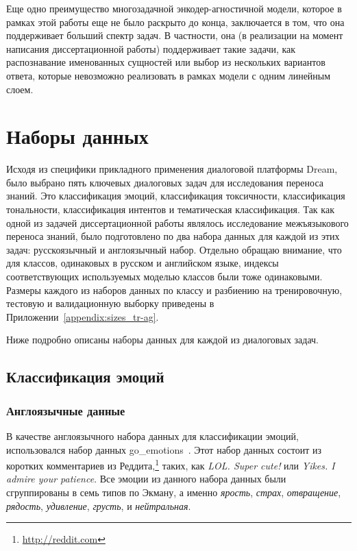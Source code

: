 Еще одно преимущество многозадачной энкодер-агностичной модели, которое в рамках этой работы еще не было раскрыто до конца, заключается в том, что она поддерживает больший спектр задач. В частности, она (в реализации на момент написания диссертационной работы) поддерживает такие задачи, как распознавание именованных сущностей или выбор из нескольких вариантов ответа, которые невозможно реализовать в рамках модели с одним линейным слоем.


\section{Наборы данных}

Исходя из специфики прикладного применения диалоговой платформы Dream, было выбрано пять ключевых диалоговых задач для исследования переноса знаний. Это классификация эмоций, классификация токсичности, классификация тональности, классификация интентов и тематическая классификация. Так как одной из задачей диссертационной работы являлось исследование межъязыкового переноса знаний, было подготовлено по два набора данных для каждой из этих задач: русскоязычный и англоязычный набор. Отдельно обращаю внимание, что для классов, одинаковых в русском и английском языке, индексы соответствующих используемых моделью классов были тоже одинаковыми. Размеры каждого из наборов данных по классу и разбиению на тренировочную, тестовую и валидационную выборку приведены в Приложении~\ref{appendix:sizes_tr-ag}.

Ниже подробно описаны наборы данных для каждой из диалоговых задач. 

\subsection{Классификация эмоций}
\subsubsection{Англоязычные данные}
В качестве англоязычного набора данных для классификации эмоций, использовался набор данных {go\_emotions}~\cite{go_emotions}. Этот набор данных состоит из коротких комментариев из Реддита,\footnote{\url{http://reddit.com}} таких, как \textit{LOL. Super cute!} или \textit{Yikes. I admire your patience}. Все эмоции из данного набора данных были сгруппированы в семь типов по Экману, а именно \textit{ярость}, \textit{страх}, \textit{отвращение}, \textit{рядость}, \textit{удивление}, \textit{грусть}, и \textit{нейтральная}.

